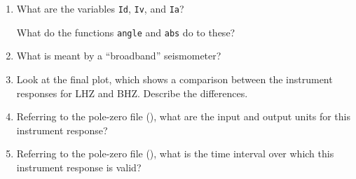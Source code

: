 \documentclass[11pt,titlepage,fleqn]{article}
\begin{document}
\begin{enumerate}

\item What are the variables \verb+Id+, \verb+Iv+, and \verb+Ia+?

What do the functions \verb+angle+ and \verb+abs+ do to these?

\item What is meant by a ``broadband'' seismometer?

\item Look at the final plot, which shows a comparison between the instrument responses for LHZ and BHZ. Describe the differences.

\item Referring to the pole-zero file (), what are the input and output units for this instrument response?

\item Referring to the pole-zero file (), what is the time interval over which this instrument response is valid?

\end{enumerate}


\iffalse
\section{Deconvolve instrument response for a seismogram}

FUTURE PART OF THE LAB (see also \verb+lab_sumatra.pdf+):
%
\begin{verbatim}
otime = 2004-12-26 00:58:50 = 732307.040856 [matlab days]
station CAN.G
duration = 10 days
start time: t1 = otime - duration - 1
end time: t2 = t1 + duration
channels: LHZ, LHE, LHN

Deconvolve instrument response on all three components.
Plot the amplitude spectrum over 0.2--1.0 mHz to show the gravest mode peaks.
Show what the main arrival looks like at bandpass 50-500s with and without decon.
Rotate to R and T to isolate SH waves.
[Having the previous 10 days allows for the noise analysis in hw_sumatraA.pdf]
\end{verbatim}
\fi


\end{document}
